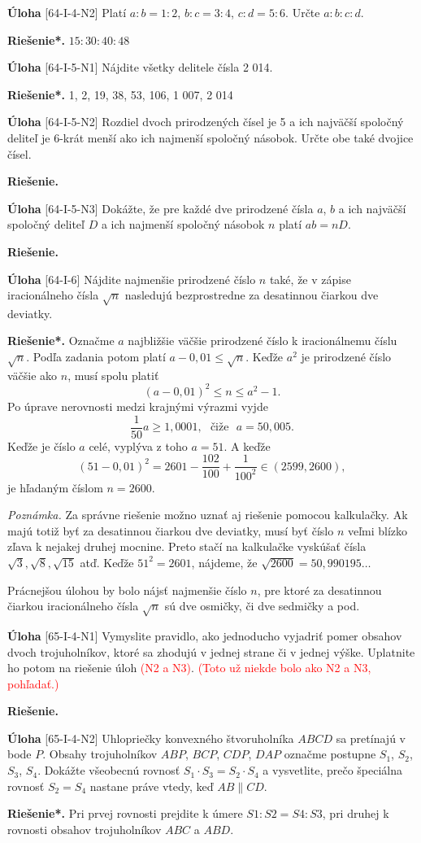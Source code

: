 \documentclass{article}
\newcommand{\rie}{\textbf{Riešenie.} }
\newcommand{\rieh}{\textbf{Riešenie*.} }
\newcommand\todo[1]{\noindent\textcolor{red}{(#1)}}
\newcommand{\problem}[4]{
  \begin{tcolorbox}[breakable,notitle,boxrule=0pt,colback=light-gray,colframe=light-gray]
    \textbf{Úloha}
    [#1] #3
  \end{tcolorbox}
  \noindent#4
}
\begin{document}
\problem{64-I-4-N2}{}{
 Platí $a : b = 1 : 2$, $b : c = 3 : 4$, $c : d = 5 : 6$. Určte $a : b : c : d$.
 }{
 \rieh $15 : 30 : 40 : 48$
 }


\problem{64-I-5-N1}{}{
Nájdite všetky delitele čísla 2 014.
}{
\rieh 1, 2, 19, 38, 53, 106, 1 007, 2 014
}

\problem{64-I-5-N2}{}{
Rozdiel dvoch prirodzených čísel je 5 a ich najväčší spoločný deliteľ je 6-krát menší ako ich najmenší spoločný násobok. Určte obe také dvojice čísel.
}{
\rie
}


\problem{64-I-5-N3}{}{
Dokážte, že pre každé dve prirodzené čísla $a$, $b$ a ich najväčší spoločný deliteľ $D$ a ich najmenší spoločný násobok $n$ platí $ab = nD$.
}{
\rie
}


\problem{64-I-6}{}{
Nájdite najmenšie prirodzené číslo $n$ také, že v zápise iracionálneho čísla $\sqrt{n}$ nasledujú bezprostredne za desatinnou čiarkou dve deviatky.
}{
\rieh Označme $a$ najbližšie väčšie prirodzené číslo k iracionálnemu číslu $\sqrt{n}$. Podľa zadania potom platí $a - 0,01 \leq \sqrt{n}$. Keďže $a^2$ je prirodzené číslo väčšie ako $n$, musí spolu platiť
$$(a - 0,01)^2 \leq n \leq  a^2 - 1.$$
Po úprave nerovnosti medzi krajnými výrazmi vyjde
$$\frac{1}{50}a \geq 1,000 1, \ \ \ \text{čiže} \ \ \  a = 50,005.$$
Keďže je číslo $a$ celé, vyplýva z toho $a = 51$. A keďže
$$(51 - 0,01)^2= 2 601 - \frac{102}{100}+\frac{1}{100^2}\in (2 599, 2 600),$$
je hľadaným číslom $n = 2 600$.

\textit{Poznámka.} Za správne riešenie možno uznať aj riešenie pomocou kalkulačky. Ak majú totiž byť za desatinnou čiarkou dve deviatky, musí byť číslo $n$ veľmi blízko zľava k nejakej druhej mocnine. Preto stačí na kalkulačke vyskúšať čísla $\sqrt{3}, \sqrt{8}, \sqrt{15}$ atď. Keďže $51^2= 2 601$, nájdeme, že $\sqrt{2 600} = 50,990 195\ldots$

Prácnejšou úlohou by bolo nájsť najmenšie číslo $n$, pre ktoré za desatinnou čiarkou iracionálneho čísla $\sqrt{n}$ sú dve osmičky, či dve sedmičky a pod.
}


\problem{65-I-4-N1}{}{
Vymyslite pravidlo, ako jednoducho vyjadriť pomer obsahov dvoch trojuholníkov, ktoré sa zhodujú v jednej strane či v jednej výške. Uplatnite ho potom na riešenie úloh \todo{N2 a N3}. \todo{Toto už niekde bolo ako N2 a N3, pohľadať.}
}{
\rie
}


\problem{65-I-4-N2}{}{
Uhlopriečky konvexného štvoruholníka $ABCD$ sa pretínajú v bode $P$. Obsahy trojuholníkov $ABP$, $BCP$, $CDP$, $DAP$ označme postupne $S_1$, $S_2$, $S_3$, $S_4$. Dokážte všeobecnú
rovnosť $S_1 \cdot S_3 = S_2 \cdot S_4$ a vysvetlite, prečo špeciálna rovnosť $S_2 = S_4$ nastane práve vtedy, keď $AB \parallel CD$.
}{
\rieh Pri prvej rovnosti prejdite k úmere $S1 : S2 = S4 : S3$, pri druhej k rovnosti obsahov trojuholníkov $ABC$ a $ABD$.
}
\end{document}
